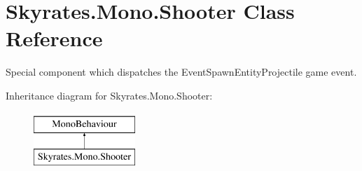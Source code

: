 \hypertarget{class_skyrates_1_1_mono_1_1_shooter}{\section{Skyrates.\-Mono.\-Shooter Class Reference}
\label{class_skyrates_1_1_mono_1_1_shooter}
}


Special component which dispatches the Event\-Spawn\-Entity\-Projectile game event.  


Inheritance diagram for Skyrates.\-Mono.\-Shooter\-:\begin{figure}[H]
\begin{center}
\leavevmode
\includegraphics[height=2.000000cm]{class_skyrates_1_1_mono_1_1_shooter}
\end{center}
\end{figure}
